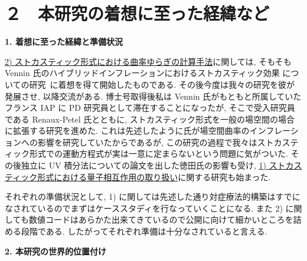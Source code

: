 \documentclass[11pt,a4j,dvipdfmx]{jarticle} 					%
\newcommand{\研究課題名}{\mgfamily\sffamily ストカスティック形式で迫る重力と量子論}
\newcommand{\研究機関名}{\mgfamily\sffamily 名古屋大学}
\newcommand{\研究代表者氏名}{\mgfamily\sffamily 多田祐一郎}
\newcommand{\研究期間の最終元号年度}{34}  %
\begin{document}



\section{２　本研究の着想に至った経緯など}


\begin{mdframed}[roundcorner=0.5zw,
	innertopmargin=0.8zw,innerbottommargin=0.8zw,
	linecolor=black!50,linewidth=0.2zw,
	backgroundcolor=black!10]
	{\bfseries\gtfamily\sffamily\large 1. 着想に至った経緯と準備状況}
\end{mdframed}

\ul{2) ストカスティック形式における曲率ゆらぎの計算手法}に関しては, そもそも Vennin 氏のハイブリッドインフレーションにおけるストカスティック効果
についての研究~\cite{Martin:2011ib}に着想を得て開始したものである. その後今度は我々の研究を彼が発展させ, 以降交流がある.
博士号取得後私は Vennin 氏がもともと所属していたフランス IAP に PD 研究員として滞在することになったが, 
そこで受入研究員である Renaux-Petel 氏とともに, ストカスティック形式を一般の場空間の場合に拡張する研究を進めた.
これは先述したように氏が場空間曲率のインフレーションへの影響を研究していたからであるが,
この研究の過程で我々はストカスティック形式での運動方程式が実は一意に定まらないという問題に気がついた.
その後独立に UV 積分法についての論文を出した徳田氏の影響も受け, \ul{1) ストカスティック形式における量子相互作用の取り扱い}に関する研究も始まった.

それぞれの準備状況として, 1) に関しては先述した通り対症療法的構築はすでになされているのでまずはケーススタディを行なっていくことになる.
また 2) に関しても数値コードはあらかた出来てきているので公開に向けて細かいところを詰める段階である. したがってそれぞれ準備は十分なされていると言える.

\begin{mdframed}[roundcorner=0.5zw,
	innertopmargin=0.8zw,innerbottommargin=0.8zw,
	linecolor=black!50,linewidth=0.2zw,
	backgroundcolor=black!10]
	{\bfseries\gtfamily\sffamily\large 2. 本研究の世界的位置付け}
\end{mdframed}
\end{document}
